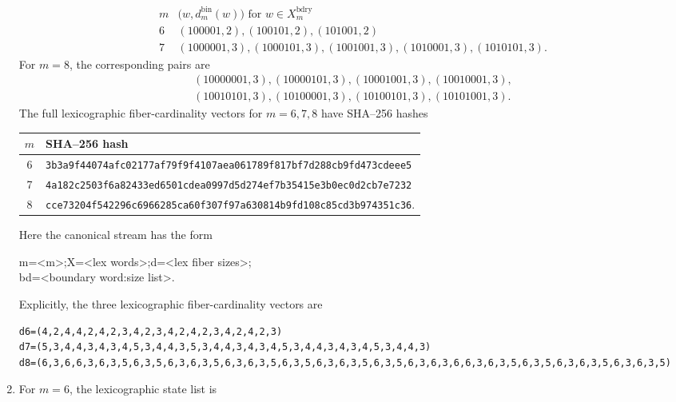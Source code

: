 \begin{proposition}
\begin{enumerate}[label=\textup{(\roman*)}]
\[
\begin{array}{c|c}
m&\bigl(w,d_m^{\mathrm{bin}}(w)\bigr)\text{ for }w\in X_m^{\mathrm{bdry}}\\ \hline
6&(100001,2),(100101,2),(101001,2)\\
7&(1000001,3),(1000101,3),(1001001,3),(1010001,3),(1010101,3).
\end{array}
\]
For \(m=8\), the corresponding pairs are
\[
\begin{gathered}
(10000001,3),(10000101,3),(10001001,3),(10010001,3),\\
(10010101,3),(10100001,3),(10100101,3),(10101001,3).
\end{gathered}
\]
The full lexicographic fiber-cardinality vectors for \(m=6,7,8\) have SHA--256 hashes
\begin{center}
\scriptsize
\begin{tabular}{c|l}
\(m\)&SHA--256 hash\\ \hline
6&\texttt{3b3a9f44074afc02177af79f9f4107aea061789f817bf7d288cb9fd473cdeee5}\\
7&\texttt{4a182c2503f6a82433ed6501cdea0997d5d274ef7b35415e3b0ec0d2cb7e7232}\\
8&\texttt{cce73204f542296c6966285ca60f307f97a630814b9fd108c85cd3b974351c36}.
\end{tabular}
\end{center}
Here the canonical stream has the form
\begin{center}
\small\ttfamily
m=<m>;X=<lex words>;d=<lex fiber sizes>;\\
bd=<boundary word:size list>.
\end{center}
Explicitly, the three lexicographic fiber-cardinality vectors are
\begin{center}
\begin{minipage}{0.9\linewidth}
\begin{Verbatim}[breaklines=true,breakanywhere=true,fontsize=\scriptsize]
d6=(4,2,4,4,2,4,2,3,4,2,3,4,2,4,2,3,4,2,4,2,3)
d7=(5,3,4,4,3,4,3,4,5,3,4,4,3,5,3,4,4,3,4,3,4,5,3,4,4,3,4,3,4,5,3,4,4,3)
d8=(6,3,6,6,3,6,3,5,6,3,5,6,3,6,3,5,6,3,6,3,5,6,3,5,6,3,6,3,5,6,3,5,6,3,6,3,6,6,3,6,3,5,6,3,5,6,3,6,3,5,6,3,6,3,5)
\end{Verbatim}
\end{minipage}
\end{center}
\item For \(m=6\), the lexicographic state list is
\begin{center}
\begin{minipage}{0.9\linewidth}
\begin{Verbatim}[breaklines=true,breakanywhere=true,fontsize=\scriptsize]

\end{Verbatim}
\end{minipage}
\end{center}
\end{enumerate}
\end{proposition}
